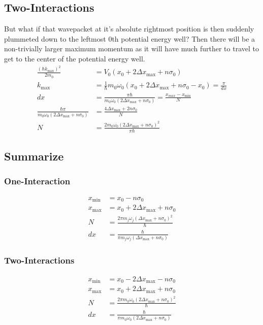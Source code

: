 \subsection{Two-Interactions}
But what if that wavepacket at it's absolute rightmost position is then suddenly plummeted down to the leftmost 0th potential energy well?  Then there will be a non-trivially larger maximum momentum as it will have much further to travel to get to the center of the potential energy well.
\begin{align}
	\frac{\left( \hbar k_{\max} \right)^2}{2 m_0}  &= V_0(x_0 + 2 \Delta x_{\max} + n \sigma_0) \\
	k_{\max} &= \frac{1}{\hbar} m_0 \omega_0 \left( x_0 + 2 \Delta x_{\max} + n \sigma_0 -x_0 \right) = \frac{\pi}{ dx} \\
	dx &= \frac{\pi \hbar}{ m_0 \omega_0 \left( 2\Delta x_{\max} + n \sigma_0\right)} = \frac{x_{max} - x_{\min}}{N} \\
	\frac{\hbar \pi}{ m_0 \omega_0 \left( 2\Delta x_{\max} + n \sigma_0\right)} &= \frac{4 \Delta x_{\max} + 2n \sigma_0}{N}\\
	N &= \frac{2 m_0 \omega_0 \left(2\Delta x_{\max} + n \sigma_0 \right)^2}{\pi  \hbar}
\end{align}

\subsection{Summarize}
\subsubsection{One-Interaction}
\begin{align}
	x_{\min} &= x_0 - n \sigma_0 \\
	x_{\max} &= x_0 + 2 \Delta x_{\max} + n \sigma_0 \\
	N &= \frac{2 \pi m_j \omega_j \left( \Delta x_{\max} + n \sigma_0\right)^2 }{\hbar} \\
	dx &= \frac{\hbar}{\pi m_j \omega_j \left( \Delta x_{\max} + n \sigma_0\right)}
\end{align}

\subsubsection{Two-Interactions}
\begin{align}
	x_{\min} &= x_0 - 2 \Delta x_{\max} - n \sigma_0 \\
	x_{\max} &= x_0 + 2 \Delta x_{\max} + n \sigma_0 \\
	N &= \frac{2 \pi m_0 \omega_0 \left(2\Delta x_{\max} + n \sigma_0 \right)^2}{\hbar}\\
	dx &= \frac{\hbar}{\pi m_0 \omega_0 \left( 2\Delta x_{\max} + n \sigma_0\right)}
\end{align}

